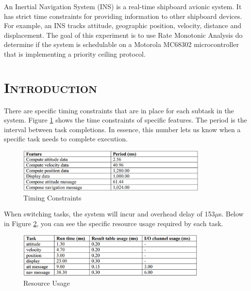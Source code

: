 \documentclass[11pt]{report}
\begin{document}
\begin{spacing}{1.5}
An Inertial Navigation System (INS) is a real-time shipboard avionic system. It has strict time constraints for providing information to other shipboard devices. For example, an INS tracks attitude, geographic position, velocity, distance and displacement.  The goal of this experiment is to use Rate Monotonic Analysis do determine if the system is schedulable on a Motorola MC68302 microcontroller that is implementing a priority ceiling protocol.

\thispagestyle{empty} %
\clearpage
\setcounter{page}{1}

\section*{\scshape Introduction} %
\label{cha:introduction}

There are specific timing constraints that are in place for each subtask in the system.  Figure \ref{fig:timing} shows the time constraints of specific features.  The period is the interval between task completions.  In essence, this number lets us know when a specific task needs to complete execution.

\vspace{15px}
\begin{figure}[H]
    \centering
    \includegraphics[width=0.85\textwidth,keepaspectratio]{timing}
    \caption{Timing Constraints}
    \label{fig:timing}
\end{figure}

When switching tasks, the system will incur and overhead delay of 153$\mu$s.  Below in Figure \ref{fig:resources}, you can see the specific resource usage required by each task.

\vspace{15px}
\begin{figure}[H]
    \centering
    \includegraphics[width=0.85\textwidth,keepaspectratio]{resources}
    \caption{Resource Usage}
    \label{fig:resources}
\end{figure}


\end{spacing}
\end{document}
